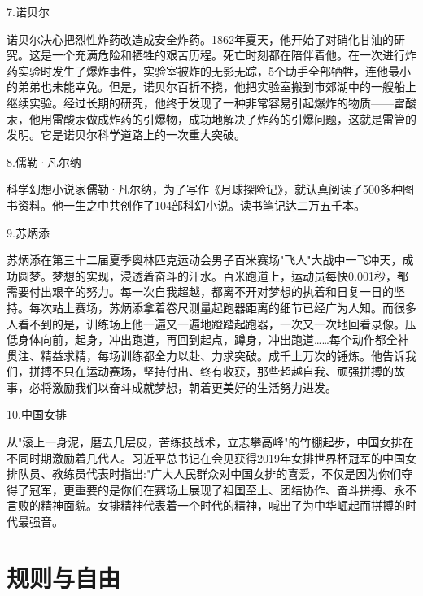 \documentclass[UTF8]{ctexart}
\begin{document}
7.诺贝尔\par
诺贝尔决心把烈性炸药改造成安全炸药。1862年夏天，他开始了对硝化甘油的研究。这是一个充满危险和牺牲的艰苦历程。死亡时刻都在陪伴着他。在一次进行炸药实验时发生了爆炸事件，实验室被炸的无影无踪，5个助手全部牺牲，连他最小的弟弟也未能幸免。但是，诺贝尔百折不挠，他把实验室搬到市郊湖中的一艘船上继续实验。经过长期的研究，他终于发现了一种非常容易引起爆炸的物质——雷酸汞，他用雷酸汞做成炸药的引爆物，成功地解决了炸药的引爆问题，这就是雷管的发明。它是诺贝尔科学道路上的一次重大突破。\par
8.儒勒·凡尔纳\par
科学幻想小说家儒勒·凡尔纳，为了写作《月球探险记》，就认真阅读了500多种图书资料。他一生之中共创作了104部科幻小说。读书笔记达二万五千本。\par
9.苏炳添\par
苏炳添在第三十二届夏季奥林匹克运动会男子百米赛场"飞人"大战中一飞冲天，成功圆梦。梦想的实现，浸透着奋斗的汗水。百米跑道上，运动员每快0.001秒，都需要付出艰辛的努力。每一次自我超越，都离不开对梦想的执着和日复一日的坚持。每次站上赛场，苏炳添拿着卷尺测量起跑器距离的细节已经广为人知。而很多人看不到的是，训练场上他一遍又一遍地蹬踏起跑器，一次又一次地回看录像。压低身体向前，起身，冲出跑道，再回到起点，蹲身，冲出跑道……每个动作都全神贯注、精益求精，每场训练都全力以赴、力求突破。成千上万次的锤炼。他告诉我们，拼搏不只在运动赛场，坚持付出、终有收获，那些超越自我、顽强拼搏的故事，必将激励我们以奋斗成就梦想，朝着更美好的生活努力进发。\par
10.中国女排\par
从"滚上一身泥，磨去几层皮，苦练技战术，立志攀高峰"的竹棚起步，中国女排在不同时期激励着几代人。习近平总书记在会见获得2019年女排世界杯冠军的中国女排队员、教练员代表时指出:"广大人民群众对中国女排的喜爱，不仅是因为你们夺得了冠军，更重要的是你们在赛场上展现了祖国至上、团结协作、奋斗拼搏、永不言败的精神面貌。女排精神代表着一个时代的精神，喊出了为中华崛起而拼搏的时代最强音。\par
\newpage
\section{规则与自由}
\end{document}
